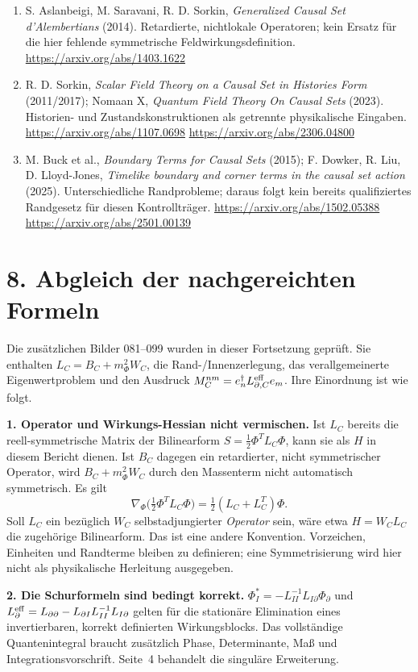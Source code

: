 \documentclass[10pt,a4paper]{article}
\newcommand{\sect}[1]{\section*{\color{navy}#1}}
\newcommand{\smallurl}[1]{{\footnotesize\url{#1}}}
\begin{document}
{\small
\begin{enumerate}
\setlength\itemsep{1pt}
\item S. Aslanbeigi, M. Saravani, R. D. Sorkin, \emph{Generalized Causal Set
d'Alembertians} (2014). Retardierte, nichtlokale Operatoren; kein Ersatz
für die hier fehlende symmetrische Feldwirkungsdefinition.
\smallurl{https://arxiv.org/abs/1403.1622}
\item R. D. Sorkin, \emph{Scalar Field Theory on a Causal Set in Histories Form}
(2011/2017); Nomaan X, \emph{Quantum Field Theory On Causal Sets} (2023).
Historien- und Zustandskonstruktionen als getrennte physikalische Eingaben.
\smallurl{https://arxiv.org/abs/1107.0698}\quad
\smallurl{https://arxiv.org/abs/2306.04800}
\item M. Buck et al., \emph{Boundary Terms for Causal Sets} (2015);
F. Dowker, R. Liu, D. Lloyd-Jones, \emph{Timelike boundary and corner terms
in the causal set action} (2025). Unterschiedliche Randprobleme; daraus
folgt kein bereits qualifiziertes Randgesetz für diesen Kontrollträger.
\smallurl{https://arxiv.org/abs/1502.05388}\quad
\smallurl{https://arxiv.org/abs/2501.00139}
\end{enumerate}}
\newpage
\sect{8. Abgleich der nachgereichten Formeln}
Die zusätzlichen Bilder 081--099 wurden in dieser Fortsetzung geprüft.
Sie enthalten $L_C=B_C+m_\Phi^2W_C$, die Rand-/Innenzerlegung,
das verallgemeinerte Eigenwertproblem und den Ausdruck
$M_C^{nm}=e_n^\dagger L^{\rm eff}_{\partial,C}e_m$.
Ihre Einordnung ist wie folgt.

\textbf{1. Operator und Wirkungs-Hessian nicht vermischen.}
Ist $L_C$ bereits die reell-symmetrische Matrix der Bilinearform
$S=\frac12\Phi^TL_C\Phi$, kann sie als $H$ in diesem Bericht dienen.
Ist $B_C$ dagegen ein retardierter, nicht symmetrischer Operator, wird
$B_C+m_\Phi^2W_C$ durch den Massenterm nicht automatisch symmetrisch.
Es gilt
\[
\nabla_\Phi\bigl(\tfrac12\Phi^TL_C\Phi\bigr)
=\tfrac12(L_C+L_C^T)\Phi.
\]
Soll $L_C$ ein bezüglich $W_C$ selbstadjungierter \emph{Operator} sein,
wäre etwa $H=W_CL_C$ die zugehörige Bilinearform. Das ist eine andere
Konvention. Vorzeichen, Einheiten und Randterme bleiben zu definieren;
eine Symmetrisierung wird hier nicht als physikalische Herleitung ausgegeben.

\textbf{2. Die Schurformeln sind bedingt korrekt.}
$\Phi_I^*=-L_{II}^{-1}L_{I\partial}\Phi_\partial$ und
$L^{\rm eff}_\partial=L_{\partial\partial}
-L_{\partial I}L_{II}^{-1}L_{I\partial}$ gelten für die stationäre
Elimination eines invertierbaren, korrekt definierten Wirkungsblocks.
Das vollständige Quantenintegral braucht zusätzlich Phase, Determinante,
Maß und Integrationsvorschrift. Seite~4 behandelt die singuläre Erweiterung.
\end{document}
